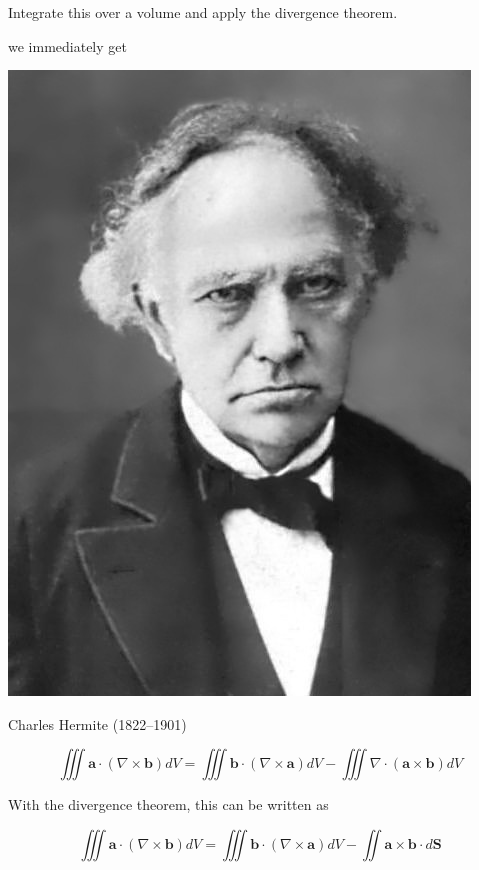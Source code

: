 \begin{cue}
Integrate this over a volume and apply the divergence theorem.  
\end{cue}

we immediately get

\begin{marginfigure}[0cm]
\includegraphics{hermite/figures/c_hermite}
\caption{Charles Hermite (1822–1901)}
\end{marginfigure}

\begin{equation}
\iiint {\mathbf a}  \cdot (\nabla \times {\mathbf b}) dV = \iiint {\mathbf b} \cdot ( \nabla \times {\mathbf a}) dV - \iiint \nabla \cdot ({\mathbf a} \times {\mathbf b}) dV 
\end{equation} 

With the divergence theorem, this can be written as

\begin{equation}
\iiint {\mathbf a}  \cdot (\nabla \times {\mathbf b}) dV = \iiint {\mathbf b} \cdot ( \nabla \times {\mathbf a}) dV - \iint  {\mathbf a} \times {\mathbf b} \cdot d{\mathbf S} \label{eq-part-int}
\end{equation} 

